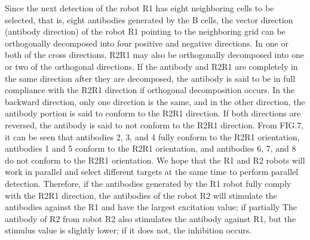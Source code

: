 \documentclass[Proceedings]{ascelike}
\begin{document}
\par
Since the next detection of the robot R1 has eight neighboring cells to be selected, that is, eight antibodies generated by the B cells, the vector direction (antibody direction) of the robot R1 pointing to the neighboring grid can be orthogonally decomposed into four positive and negative directions. In one or both of the cross directions, R2R1 may also be orthogonally decomposed into one or two of the orthogonal directions. If the antibody and R2R1 are completely in the same direction after they are decomposed, the antibody is said to be in full compliance with the R2R1 direction if orthogonal decomposition occurs. In the backward direction, only one direction is the same, and in the other direction, the antibody portion is said to conform to the R2R1 direction. If both directions are reversed, the antibody is said to not conform to the R2R1 direction. From FIG.7, it can be seen that antibodies 2, 3, and 4 fully conform to the R2R1 orientation, antibodies 1 and 5 conform to the R2R1 orientation, and antibodies 6, 7, and 8 do not conform to the R2R1 orientation. We hope that the R1 and R2 robots will work in parallel and select different targets at the same time to perform parallel detection. Therefore, if the antibodies generated by the R1 robot fully comply with the R2R1 direction, the antibodies of the robot R2 will stimulate the antibodies against the R1 and have the largest excitation value; if partially The antibody of R2 from robot R2 also stimulates the antibody against R1, but the stimulus value is slightly lower; if it does not, the inhibition occurs.
\end{document}
